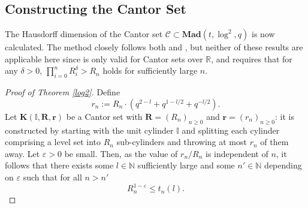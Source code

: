 \documentclass{article}
\theoremstyle{definition}
\newcommand{\N}{\mathbb{N}}
\newcommand{\R}{\mathbb{R}}
\newcommand{\I}{\mathbb{I}}
\numberwithin{equation}{subsection}
\begin{document}
\subsection{Constructing the Cantor Set}
\noindent The Hausdorff dimension of the Cantor set $\mathcal{C}\subset \textbf{Mad}(t,\log^2,q)$ is now calculated. The method closely follows both \cite[Lemma 1]{cantor} and \cite[Lemma 3.1]{Bad_Harr}, but neither of these results are applicable here since \cite[Lemma 1]{cantor} is only valid for Cantor sets over $\R$, and \cite[Lemma 3.1]{Bad_Harr} requires that for any $\delta>0$, $\prod_{i=0}^nR_i^\delta>R_n$ holds for sufficiently large $n$. 
 \begin{proof}[Proof of Theorem \ref{log2}]
 Define \[r_n:=R_n\cdot\left(q^{2-l}+q^{1-l/2}+q^{-l/2}\right).\] Let $\mathbf{K}(\mathbb{I},\mathbf{R},\mathbf{r})$ be a Cantor set with $\mathbf{R}=(R_n)_{n\ge0}$ and $\mathbf{r}=(r_n)_{n\ge0}$: it is constructed by starting with the unit cylinder $\I$ and splitting each cylinder comprising a level set into $R_n$ sub-cylinders and throwing at most $r_n$ of them away. Let $\varepsilon>0$ be small. Then, as the value of $r_n/R_n$ is independent of $n$, it follows that there exists some $l\in\N$ sufficiently large and some $n'\in\N$ depending on $\varepsilon$ such that for all $n>n'$ \begin{equation}\label{cantor1}
R_n^{1-\varepsilon}\le t_n(l).
\end{equation} 


\end{proof}
\end{document}
